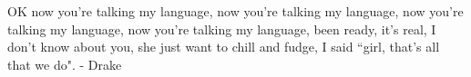OK now you're talking my language, now you're talking my language, now you're talking my language, now you're talking my language, been ready, it's real, I don't know about you, she just want to chill and fudge, I said ``girl, that's all that we do". - Drake

